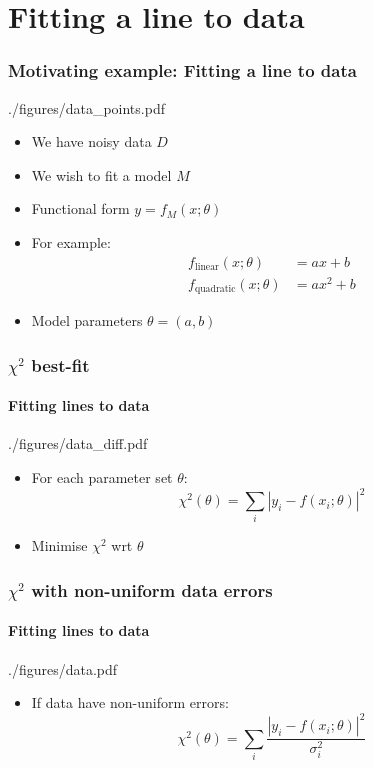 \documentclass[%
]{beamer}
\begin{document}
\section{Fitting a line to data}
\begin{frame}
    \frametitle{Motivating example: Fitting a line to data}
    \begin{figright}[0.4]{./figures/data_points.pdf}
        \begin{itemize}
            \item We have noisy data $D$
            \item We wish to fit a model $M$
            \item Functional form $y=f_M(x;\theta)$
            \item For example:
                \begin{align}
                     f_\text{linear}(x;\theta)&=a x + b       \nonumber\\
                     f_\text{quadratic}(x;\theta)&=a x^2 + b  \nonumber
                \end{align}
            \item Model parameters $\theta= (a,b)$
        \end{itemize}
    \end{figright}
\end{frame}

\begin{frame}
    \frametitle{$\chi^2$ best-fit}
    \framesubtitle{Fitting lines to data}
    \begin{figright}[0.4]{./figures/data_diff.pdf}
        \begin{itemize}
            \item For each parameter set $\theta$:
                \[
                    \chi^2(\theta) = \sum_i \left|y_i - f(x_i;\theta)\right|^2
                \]
            \item Minimise $\chi^2$ wrt $\theta$
        \end{itemize}
    \end{figright}
\end{frame}

\begin{frame}
    \frametitle{$\chi^2$ with non-uniform data errors}
    \framesubtitle{Fitting lines to data}
    \begin{figright}[0.4]{./figures/data.pdf}
        \begin{itemize}
            \item If data have non-uniform errors:
                \[
                    \chi^2(\theta) = \sum_i \frac{\left|y_i - f(x_i;\theta)\right|^2}{\sigma_i^2}
                \]
        \end{itemize}
    \end{figright}
\end{frame}
\end{document}
